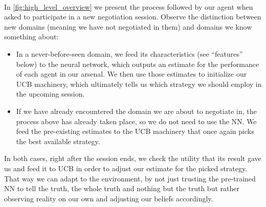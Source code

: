 \documentclass[12pt]{article}
\numberwithin{equation}{section}
\newcommand{\quotes}[1]{\textquotedblleft #1\textquotedblright \ }
\begin{document}
			\paragraph*{}
				In \ref{fig:high_level_overview} we present the process followed by our agent when asked to participate in a new negotiation session. Observe the distinction between new domains (meaning we have not negotiated in them) and domains we know something about: 
				\begin{itemize}
					\item In a never-before-seen domain, we feed its characteristics (see \quotes{features} below) %
					to the neural network, which outputs an estimate for the performance of each agent in our arsenal. We then use those estimates to initialize our UCB machinery, which ultimately tells us which strategy we should employ in the upcoming session.
					
					\item If we have already encountered the domain we are about to negotiate in, the process above has already taken place, so we do not need to use the NN. We feed the pre-existing estimates to the UCB machinery that once again picks the best available strategy.
				\end{itemize}
				In both cases, right after the session ends, we check the utility that its result gave us and feed it to UCB in order to adjust our estimate for the picked strategy. That way we can adapt to the environment, by not just trusting the pre-trained NN to tell the truth, the whole truth and nothing but the truth but rather observing reality on our own and adjusting our beliefs accordingly. %
\end{document}
